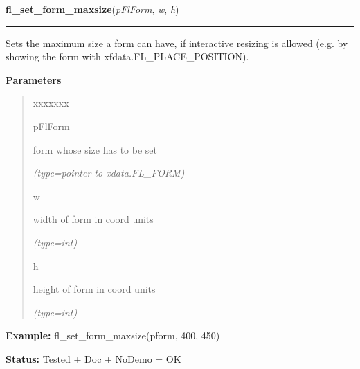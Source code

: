     \vspace{0.5ex}

\hspace{.8\funcindent}\begin{boxedminipage}{\funcwidth}

    \raggedright \textbf{fl\_set\_form\_maxsize}(\textit{pFlForm}, \textit{w}, \textit{h})

    \vspace{-1.5ex}

    \rule{\textwidth}{0.5\fboxrule}
\setlength{\parskip}{2ex}
    Sets the maximum size a form can have, if interactive resizing is 
    allowed (e.g. by showing the form with xfdata.FL\_PLACE\_POSITION).

\setlength{\parskip}{1ex}
      \textbf{Parameters}
      \vspace{-1ex}

      \begin{quote}
        \begin{Ventry}{xxxxxxx}

          \item[pFlForm]

          form whose size has to be set

            {\it (type=pointer to xdata.FL\_FORM)}

          \item[w]

          width of form in coord units

            {\it (type=int)}

          \item[h]

          height of form in coord units

            {\it (type=int)}

        \end{Ventry}

      \end{quote}

\textbf{Example:} fl\_set\_form\_maxsize(pform, 400, 450)



\textbf{Status:} Tested + Doc + NoDemo = OK



    \end{boxedminipage}

    \label{xformslib:flbasic:fl_set_form_event_cmask}

